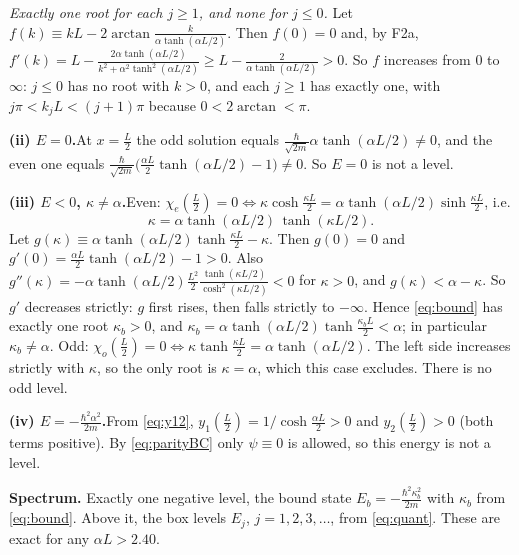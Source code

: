 \documentclass[11pt]{article}
\numberwithin{equation}{section}
\newcommand{\hs}{\tfrac{\hbar}{\sqrt{2m}}}
\newcommand{\tL}{\tanh(\alpha L/2)}
\begin{document}
\emph{Exactly one root for each $j\ge1$, and none for $j\le0$.} Let $f(k)\equiv kL-2\arctan\frac{k}{\alpha\tL}$. Then $f(0)=0$ and, by F2a, $f'(k)=L-\frac{2\alpha\tL}{k^2+\alpha^2\tanh^2(\alpha L/2)}\ge L-\frac{2}{\alpha\tL}>0$. So $f$ increases from $0$ to $\infty$: $j\le0$ has no root with $k>0$, and each $j\ge1$ has exactly one, with $j\pi<k_jL<(j+1)\pi$ because $0<2\arctan<\pi$.

\textbf{(ii) $E=0$.}\quad At $x=\frac L2$ the odd solution equals $\hs\alpha\tL\neq0$, and the even one equals $\hs\big(\frac{\alpha L}{2}\tL-1\big)\neq0$. So $E=0$ is not a level.

\textbf{(iii) $E<0$, $\kappa\neq\alpha$.}\quad Even: $\chi_e(\frac L2)=0\iff\kappa\cosh\frac{\kappa L}2=\alpha\tL\sinh\frac{\kappa L}2$, i.e.
\begin{equation}
\kappa=\alpha\tL\,\tanh(\kappa L/2).
\label{eq:bound}
\end{equation}
Let $g(\kappa)\equiv\alpha\tL\tanh\frac{\kappa L}2-\kappa$. Then $g(0)=0$ and $g'(0)=\frac{\alpha L}2\tL-1>0$. Also $g''(\kappa)=-\alpha\tL\frac{L^2}2\frac{\tanh(\kappa L/2)}{\cosh^2(\kappa L/2)}<0$ for $\kappa>0$, and $g(\kappa)<\alpha-\kappa$. So $g'$ decreases strictly: $g$ first rises, then falls strictly to $-\infty$. Hence \eqref{eq:bound} has exactly one root $\kappa_b>0$, and $\kappa_b=\alpha\tL\tanh\frac{\kappa_bL}2<\alpha$; in particular $\kappa_b\neq\alpha$.
Odd: $\chi_o(\frac L2)=0\iff\kappa\tanh\frac{\kappa L}2=\alpha\tL$. The left side increases strictly with $\kappa$, so the only root is $\kappa=\alpha$, which this case excludes. There is no odd level.

\textbf{(iv) $E=-\frac{\hbar^2\alpha^2}{2m}$.}\quad From \eqref{eq:y12}, $y_1(\frac L2)=1/\cosh\frac{\alpha L}2>0$ and $y_2(\frac L2)>0$ (both terms positive). By \eqref{eq:parityBC} only $\psi\equiv0$ is allowed, so this energy is not a level.

\begin{result}
\textbf{Spectrum.} Exactly one negative level, the bound state $E_b=-\frac{\hbar^2\kappa_b^2}{2m}$ with $\kappa_b$ from \eqref{eq:bound}. Above it, the box levels $E_j$, $j=1,2,3,\dots$, from \eqref{eq:quant}. These are exact for any $\alpha L>2.40$.
\end{result}
\end{document}
